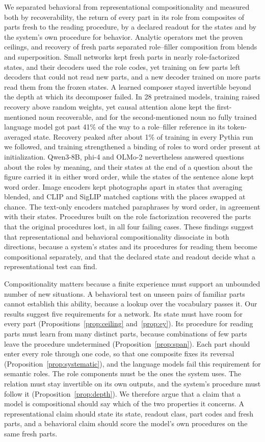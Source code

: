 \documentclass[10pt]{article}
\theoremstyle{plain}
\theoremstyle{remark}
\begin{document}
We separated behavioral from representational compositionality and measured both by recoverability, the return of every part in its role from composites of parts fresh to the reading procedure, by a declared readout for the states and by the system's own procedure for behavior. Analytic operators met the proven ceilings, and recovery of fresh parts separated role--filler composition from blends and superposition. Small networks kept fresh parts in nearly role-factorized states, and their decoders used the role codes, yet training on few parts left decoders that could not read new parts, and a new decoder trained on more parts read them from the frozen states. A learned composer stayed invertible beyond the depth at which its decomposer failed. In 28 pretrained models, training raised recovery above random weights, yet causal attention alone kept the first-mentioned noun recoverable, and for the second-mentioned noun no fully trained language model got past 41\% of the way to a role--filler reference in its token-averaged state. Recovery peaked after about 1\% of training in every Pythia run we followed, and training strengthened a binding of roles to word order present at initialization. Qwen3-8B, phi-4 and OLMo-2 nevertheless answered questions about the roles by meaning, and their states at the end of a question about the figure carried it in either word order, while the states of the sentence alone kept word order. Image encoders kept photographs apart in states that averaging blended, and CLIP and SigLIP matched captions with the places swapped at chance. The text-only encoders matched paraphrases by word order, in agreement with their states. Procedures built on the role factorization recovered the parts that the original procedures lost, in all four failing cases. These findings suggest that representational and behavioral compositionality dissociate in both directions, because a system's states and its procedures for reading them become compositional separately, and that the declared state and readout decide what a representational test can find.

Compositionality matters because a finite experience must support an unbounded number of new situations. A behavioral test on unseen pairs of familiar parts cannot establish this ability, because a lookup over the vocabulary passes it. Our results suggest five requirements for a network. Its state must have room for every part (Propositions~\ref{prop:ceiling} and~\ref{prop:ey}). Its procedure for reading parts must learn from many distinct parts, because combinations of few parts leave the procedure undetermined (Proposition~\ref{prop:span}). Each part should enter every role through one code, so that one composite fixes its reversal (Proposition~\ref{prop:systematic}), and the language models fail this requirement for semantic roles. The role components must be the ones the system uses. The relation must stay invertible on its own outputs, and the system's procedure must follow it (Proposition~\ref{prop:depth}). We therefore argue that a claim that a model is compositional should say which of the two properties it concerns. A representational claim should state its state, readout class, part codes and fresh parts, and a behavioral claim should score the model's own procedures on the same fresh parts.
\end{document}
